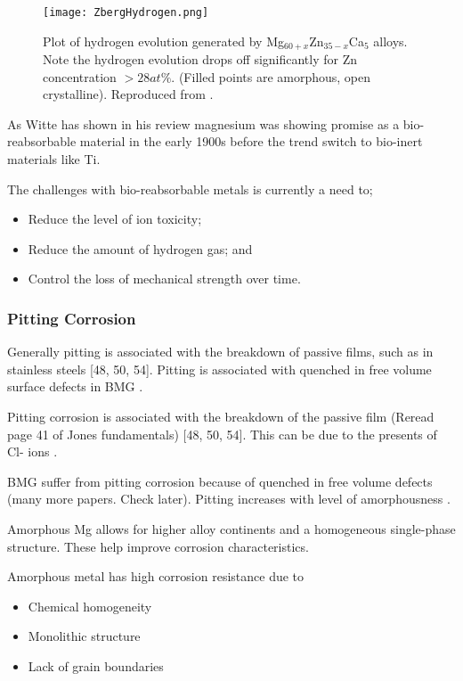 \documentclass[a4paper,12pt,oneside]{report}%
\begin{document}
\begin{figure}[htbp]
	\centering
	\texttt{[image: ZbergHydrogen.png]}
	\caption{Plot of hydrogen evolution generated by Mg$_{60+x}$Zn$_{35-x}$Ca$_{5}$ alloys. Note the hydrogen evolution drops off significantly for Zn concentration $>28at\%$. (Filled points are amorphous, open crystalline). Reproduced from \cite{Zberg2009}.}
	\label{fig:ZbergHydrogen}
\end{figure}

As Witte \cite{Witte2010} has shown in his review magnesium was showing promise as a bio-reabsorbable material in the early 1900s before the trend switch to bio-inert materials like Ti. 

The challenges with bio-reabsorbable metals is currently a need to;

\begin{itemize}
	\item Reduce the level of ion toxicity;
	\item Reduce the amount of hydrogen gas; and
	\item Control the loss of mechanical strength over time. 
\end{itemize}

\subsubsection{Pitting Corrosion}
Generally pitting is associated with the breakdown of passive films, such as in stainless steels [48, 50, 54]. Pitting is associated with quenched in free volume surface defects in BMG \cite{Wang2012}.  

Pitting corrosion is associated with the breakdown of the passive film (Reread page 41 of Jones fundamentals) [48, 50, 54]. This can be due to the presents of Cl- ions \cite{Zheng2014}. 

BMG suffer from pitting corrosion because of quenched in free volume defects \cite{Wang2012} (many more papers. Check later). Pitting increases with level of amorphousness \cite{Schluter2012}. 

Amorphous Mg allows for higher alloy continents and a homogeneous single-phase structure.  These help improve corrosion characteristics. 

Amorphous metal has high corrosion resistance due to

\begin{itemize}
	\item Chemical homogeneity 
	\item Monolithic structure
	\item Lack of grain boundaries 
\end{itemize}
 
\end{document}
